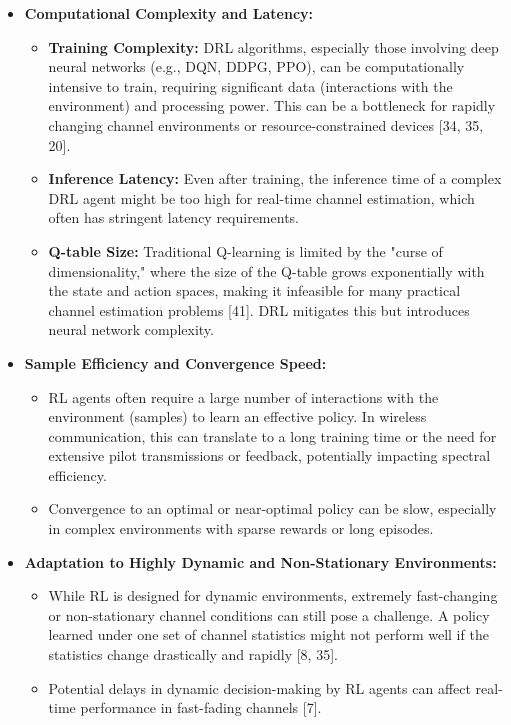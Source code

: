 \documentclass[journal,twocolumn]{IEEEtran}
\begin{document}
\begin{itemize}
    \item \textbf{Computational Complexity and Latency:}
        \begin{itemize}
            \item \textbf{Training Complexity:} DRL algorithms, especially those involving deep neural networks (e.g., DQN, DDPG, PPO), can be computationally intensive to train, requiring significant data (interactions with the environment) and processing power. This can be a bottleneck for rapidly changing channel environments or resource-constrained devices [34, 35, 20].
            \item \textbf{Inference Latency:} Even after training, the inference time of a complex DRL agent might be too high for real-time channel estimation, which often has stringent latency requirements.
            \item \textbf{Q-table Size:} Traditional Q-learning is limited by the "curse of dimensionality," where the size of the Q-table grows exponentially with the state and action spaces, making it infeasible for many practical channel estimation problems [41]. DRL mitigates this but introduces neural network complexity.
        \end{itemize}
    \item \textbf{Sample Efficiency and Convergence Speed:}
        \begin{itemize}
            \item RL agents often require a large number of interactions with the environment (samples) to learn an effective policy. In wireless communication, this can translate to a long training time or the need for extensive pilot transmissions or feedback, potentially impacting spectral efficiency.
            \item Convergence to an optimal or near-optimal policy can be slow, especially in complex environments with sparse rewards or long episodes.
        \end{itemize}
    \item \textbf{Adaptation to Highly Dynamic and Non-Stationary Environments:}
        \begin{itemize}
            \item While RL is designed for dynamic environments, extremely fast-changing or non-stationary channel conditions can still pose a challenge. A policy learned under one set of channel statistics might not perform well if the statistics change drastically and rapidly [8, 35].
            \item Potential delays in dynamic decision-making by RL agents can affect real-time performance in fast-fading channels [7].

\end{itemize}
\end{itemize}
\end{document}
